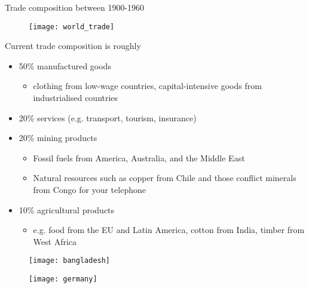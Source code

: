 \documentclass{beamer}
\begin{document}
\begin{frame}{Trade composition between 1900-1960}
  \begin{figure}
    \texttt{[image: world\_trade]}  \end{figure}
  
\end{frame}

\begin{frame}{}
Current trade composition is roughly
\medskip
\begin{itemize}
  \item 50\% manufactured goods
  \begin{itemize}
    \item clothing from low-wage countries, capital-intensive goods from industrialised countries
  \end{itemize}
  \medskip
  \item 20\% services (e.g. transport, tourism, insurance)
  \medskip
  \item 20\% mining products
  \begin{itemize}
    \item Fossil fuels from America, Australia, and the Middle East
    \item Natural resources such as copper from Chile and those conflict minerals from Congo for your telephone
  \end{itemize}
  \medskip
  \item 10\% agricultural products
  \begin{itemize}
    \item e.g. food from the EU and Latin America, cotton from India, timber from West Africa
  \end{itemize}
\end{itemize}  
\end{frame}

\begin{frame}
  \begin{figure}\centering
    \texttt{[image: bangladesh]}
  \end{figure}
\end{frame}

\begin{frame}
  \begin{figure}\centering
    \texttt{[image: germany]}
  \end{figure}
\end{frame}
\end{document}
